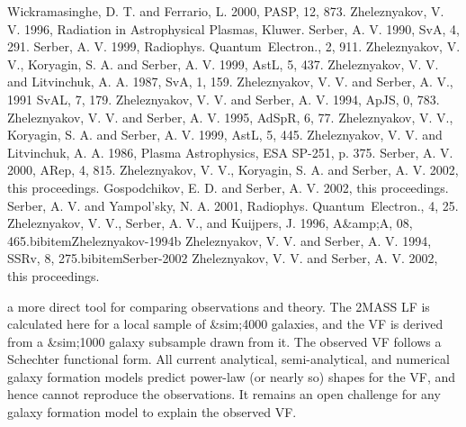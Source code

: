 Wickramasinghe, D. T. and Ferrario, L. 2000, PASP, 12, 873.
 Zheleznyakov, V. V. 1996, Radiation in Astrophysical Plasmas, Kluwer.
Serber, A. V. 1990, SvA, 4, 291.
 Serber, A. V.
1999, Radiophys. Quantum\ Electron., 2, 911.
 Zheleznyakov, V. V., Koryagin,
S. A. and Serber, A. V. 1999, AstL, 5, 437.
 Zheleznyakov, V. V. and Litvinchuk, A. A. 1987, SvA, 1, 159.
 Zheleznyakov, V. V. and Serber, A. V., 1991 SvAL, 7, 179.
 Zheleznyakov, V. V. and Serber, A. V. 1994, ApJS, 0, 783.
 Zheleznyakov, V. V.
and Serber, A. V. 1995, AdSpR, 6, 77.
 Zheleznyakov, V. V., Koryagin, S. A.
and Serber, A. V. 1999, AstL, 5, 445.
 Zheleznyakov, V. V. and Litvinchuk, A. A. 1986, Plasma Astrophysics, ESA SP-251,
p. 375.
 Serber, A. V. 2000, ARep, 4, 815.
 Zheleznyakov, V. V., Koryagin,
S. A. and Serber, A. V. 2002, this proceedings.  Gospodchikov, E. D. and Serber, A. V. 2002,
this proceedings.
 Serber, A. V. and Yampol'sky, N. A.
2001, Radiophys. Quantum\ Electron., 4, 25.
 Zheleznyakov, V. V., Serber, A. V., and Kuijpers, J. 1996, A&amp;A, 08,
465.bibitem{Zheleznyakov-1994b} Zheleznyakov, V. V. and Serber, A. V. 1994, SSRv, 8,
275.bibitem{Serber-2002} Zheleznyakov, V. V. and Serber, A. V. 2002, this proceedings.


a more direct tool for comparing observations and theory.
The 2MASS LF is calculated here for a local sample of &sim;4000 galaxies,
and the VF is derived from a &sim;1000 galaxy subsample drawn from it.
The observed VF follows a Schechter functional form.
All current analytical, semi-analytical, and numerical galaxy formation models predict
power-law (or nearly so) shapes for the VF, and hence cannot reproduce the observations.
It remains an open challenge for any galaxy formation model to explain the observed VF.

